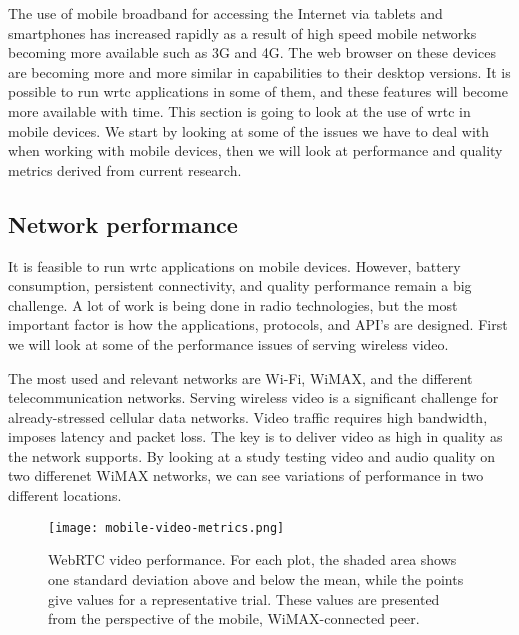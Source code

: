
The use of mobile broadband for accessing the Internet via tablets and smartphones has increased rapidly as a result of high speed mobile networks becoming more available such as 3G and 4G. The web browser on these devices are becoming more and more similar in capabilities to their desktop versions. It is possible to run \gls{wrtc} applications in some of them, and these features will become more available with time. This section is going to look at the use of \gls{wrtc} in mobile devices. We start by looking at some of the issues we have to deal with when working with mobile devices, then we will look at performance and quality metrics derived from current research.

\subsection{Network performance}
It is feasible to run \gls{wrtc} applications on mobile devices. However, battery consumption,  persistent connectivity, and quality performance remain a big challenge. A lot of work is being done in radio technologies, but the most important factor is how the applications, protocols, and API's are designed\cite{isomaki2012considerations}. First we will look at some of the performance issues of serving wireless video.

The most used and relevant networks are Wi-Fi, WiMAX, and the different telecommunication networks. Serving wireless video is a significant challenge for already-stressed cellular data networks\cite{erman2011over}. Video traffic requires high bandwidth, imposes latency and packet loss. The key is to deliver video as high in quality as the network supports. By looking at a study testing video and audio quality on two differenet WiMAX networks\cite{fund2013performance}, we can see variations of performance in two different locations.

\pagebreak
\begin{figure}[here]
\centerline{\texttt{[image: mobile-video-metrics.png]}}
\caption{WebRTC video performance. For each plot, the shaded area shows one standard deviation above and below the mean, while the
points give values for a representative trial. These values are presented from the perspective of the mobile, WiMAX-connected peer.
}
\label{fig:mobile-video-metrics}
\end{figure}

